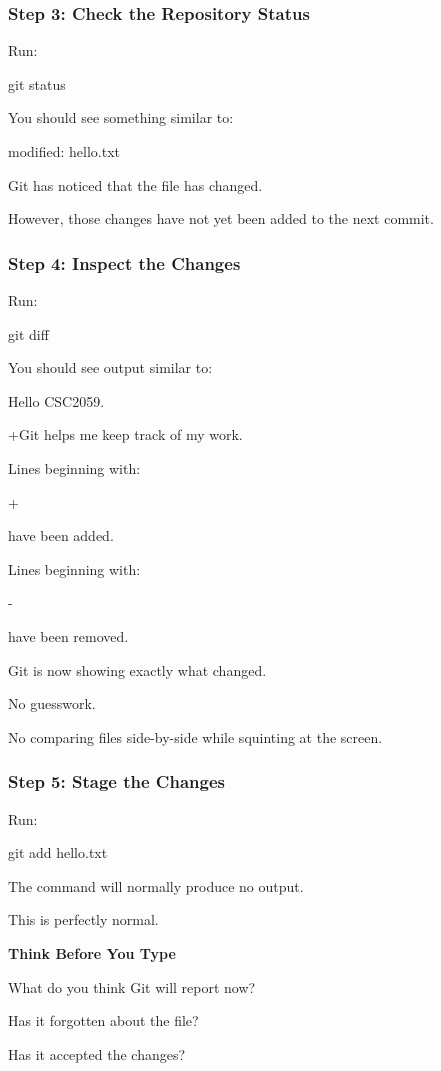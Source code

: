 \documentclass{csc2059practical}
\begin{document}
\subsubsection{Step 3: Check the Repository Status}
Run:

\begin{terminalplain}
git status
\end{terminalplain}
You should see something similar to:

\begin{terminalplain}
modified: hello.txt
\end{terminalplain}
Git has noticed that the file has changed.

However, those changes have not yet been added to the next commit.

\subsubsection{Step 4: Inspect the Changes}
Run:

\begin{terminalplain}
git diff
\end{terminalplain}
You should see output similar to:

\begin{terminalplain}
Hello CSC2059.
\end{terminalplain}
+Git helps me keep track of my work.

Lines beginning with:

+

have been added.

Lines beginning with:

-

have been removed.

Git is now showing exactly what changed.

No guesswork.

No comparing files side-by-side while squinting at the screen.

\subsubsection{Step 5: Stage the Changes}
Run:

\begin{terminalplain}
git add hello.txt
\end{terminalplain}
The command will normally produce no output.

This is perfectly normal.

\begin{commonerror}
\textbf{Think Before You Type}\par
\medskip

What do you think Git will report now?


Has it forgotten about the file?


Has it accepted the changes?


\end{commonerror}
\end{document}
